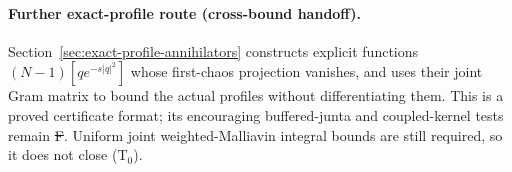 \paragraph{Further exact-profile route (cross-bound handoff).}
Section~\ref{sec:exact-profile-annihilators} constructs explicit functions
$(N-1)[q e^{-s|q|^2}]$ whose first-chaos projection vanishes, and uses
their joint Gram matrix to bound the actual profiles without differentiating
them. This is a proved certificate format; its encouraging buffered-junta
and coupled-kernel tests remain \st{F}. Uniform joint weighted-Malliavin
integral bounds are still required, so it does not close (T$_0$).
